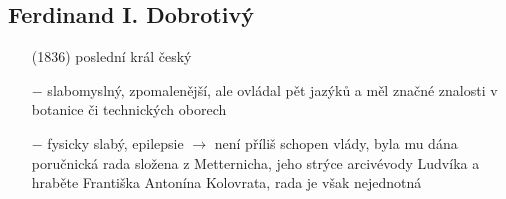 \documentclass{article}
\begin{document}
\subsection*{Ferdinand I. Dobrotivý}
\begin{itemize}
    \vspace{-0.5em}
    \setlength\itemsep{0.15em}
    \item[(1836)] poslední král český
    \item[$-$] slabomyslný, zpomalenější, ale ovládal pět jazýků a měl značné znalosti v botanice či technických oborech
    \item[$-$] fysicky slabý, epilepsie $\rightarrow$ není příliš schopen vlády, byla mu dána poručnická rada složena z Metternicha, jeho strýce arcivévody Ludvíka a hraběte Františka Antonína Kolovrata, rada je však nejednotná
\end{itemize}
\end{document}

